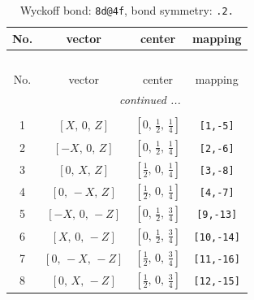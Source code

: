 \documentclass[fleqn,8pt]{jsarticle}
\begin{document}
\begin{longtable}{cccc}
\caption{Wyckoff bond: {\tt 8d@4f}, bond symmetry: {\tt .2.}}
 \\
 \hline \hline
No. & vector & center & mapping \\ \hline \endfirsthead

\multicolumn{3}{l}{\tablename\ \thetable{}} \\
 \hline \hline
No. & vector & center & mapping \\ \hline \endhead

 \hline \hline
\multicolumn{3}{r}{\footnotesize\it continued ...} \\ \endfoot

 \hline \hline
\multicolumn{3}{r}{} \\ \endlastfoot

1 & $\left[ X,\, 0,\, Z \right]$ & $\left[ 0,\, \frac{1}{2},\, \frac{1}{4} \right]$ & {\tt [1,-5]} \\ \hline
2 & $\left[ - X,\, 0,\, Z \right]$ & $\left[ 0,\, \frac{1}{2},\, \frac{1}{4} \right]$ & {\tt [2,-6]} \\ \hline
3 & $\left[ 0,\, X,\, Z \right]$ & $\left[ \frac{1}{2},\, 0,\, \frac{1}{4} \right]$ & {\tt [3,-8]} \\ \hline
4 & $\left[ 0,\, - X,\, Z \right]$ & $\left[ \frac{1}{2},\, 0,\, \frac{1}{4} \right]$ & {\tt [4,-7]} \\ \hline
5 & $\left[ - X,\, 0,\, - Z \right]$ & $\left[ 0,\, \frac{1}{2},\, \frac{3}{4} \right]$ & {\tt [9,-13]} \\ \hline
6 & $\left[ X,\, 0,\, - Z \right]$ & $\left[ 0,\, \frac{1}{2},\, \frac{3}{4} \right]$ & {\tt [10,-14]} \\ \hline
7 & $\left[ 0,\, - X,\, - Z \right]$ & $\left[ \frac{1}{2},\, 0,\, \frac{3}{4} \right]$ & {\tt [11,-16]} \\ \hline
8 & $\left[ 0,\, X,\, - Z \right]$ & $\left[ \frac{1}{2},\, 0,\, \frac{3}{4} \right]$ & {\tt [12,-15]} \\
\end{longtable}
\renewcommand{\arraystretch}{1.2}
\end{document}
